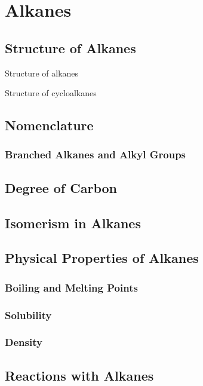 \documentclass[../main]{subfiles}
\begin{document}
\section{Alkanes}

\subsection{Structure of Alkanes}

Structure of alkanes

Structure of cycloalkanes

\subsection{Nomenclature}

\subsubsection{Branched Alkanes and Alkyl Groups}

\subsection{Degree of Carbon}

\subsection{Isomerism in Alkanes}

\subsection{Physical Properties of Alkanes}

\subsubsection{Boiling and Melting Points}

\subsubsection{Solubility}

\subsubsection{Density}

\subsection{Reactions with Alkanes}
\end{document}
